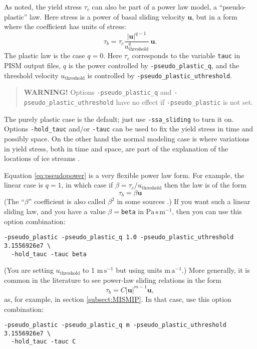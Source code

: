 As noted, the yield stress $\tau_c$ can also be part of a power law model, a ``pseudo-plastic'' law.  Here stress is a power of basal sliding velocity $\mathbf{u}$, but in a form where the coefficient has units of stress:
\begin{equation}
\tau_b = \tau_c \frac{|\mathbf{u}|^{q-1}}{u_{\text{threshold}}^q}\, \mathbf{u}.
\label{eq:pseudopower}
\end{equation}
The plastic law is the case $q=0$.  Here $\tau_c$ corresponds to the variable \texttt{tauc} in PISM output files, $q$ is the power controlled by \texttt{-pseudo_plastic_q}, and the threshold velocity $u_{\text{threshold}}$ is controlled by \texttt{-pseudo_plastic_uthreshold}.

\begin{quote}
  \textbf{WARNING!} Options \texttt{-pseudo_plastic_q} and \texttt{-pseudo_plastic_uthreshold} have no effect if \texttt{-pseudo_plastic} is not set.
\end{quote}

The purely plastic case is the default; just use \verb|-ssa_sliding| to turn it on.  Options \verb|-hold_tauc| and/or \verb|-tauc| can be used to fix the yield stress in time and possibly space.  On the other hand the normal modeling case is where variations in yield stress, both in time and space, are part of the explanation of the locations of ice streams \cite{SchoofStream}.

Equation \eqref{eq:pseudopower} is a very flexible power law form.  For example, the linear case is $q=1$, in which case if $\beta=\tau_c/u_{\text{threshold}}$ then the law is of the form
    $$\tau_b = \beta \mathbf{u}$$
(The ``$\beta$'' coefficient is also called $\beta^2$ in some sources \cite[for example]{MacAyeal}.)  If you want such a linear sliding law, and you have a value $\beta=$\verb|beta| in $\text{Pa}\,\text{s}\,\text{m}^{-1}$, then you can use this option combination:
\begin{verbatim}
-pseudo_plastic -pseudo_plastic_q 1.0 -pseudo_plastic_uthreshold 3.1556926e7 \
  -hold_tauc -tauc beta
\end{verbatim}
\noindent (You are setting $u_{\text{threshold}}$ to 1 $\text{m}\,\text{s}^{-1}$ but using units $\text{m}\,\text{a}^{-1}$.)  More generally, it is common in the literature to see power-law sliding relations in the form
    $$\tau_b = C |\mathbf{u}|^{m-1} \mathbf{u},$$
as, for example, in section \ref{subsect:MISMIP}.  In that case, use this option combination:
\begin{verbatim}
-pseudo_plastic -pseudo_plastic_q m -pseudo_plastic_uthreshold 3.1556926e7 \
  -hold_tauc -tauc C
\end{verbatim}

